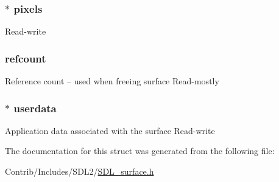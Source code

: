 \subsubsection[{\texorpdfstring{pixels}{pixels}}]{$\ast$ pixels}\hypertarget{struct_s_d_l___surface_aaf78c2553b191735d6902cafb68a92ff}{}\label{struct_s_d_l___surface_aaf78c2553b191735d6902cafb68a92ff}
Read-\/write 
\subsubsection[{\texorpdfstring{refcount}{refcount}}]{ refcount}\hypertarget{struct_s_d_l___surface_a6022c8a609170c7365fb96e83cb2df48}{}\label{struct_s_d_l___surface_a6022c8a609170c7365fb96e83cb2df48}
Reference count -- used when freeing surface Read-\/mostly 
\subsubsection[{\texorpdfstring{userdata}{userdata}}]{$\ast$ userdata}\hypertarget{struct_s_d_l___surface_afd0ffb02780e738d4c0a10ab833b7834}{}\label{struct_s_d_l___surface_afd0ffb02780e738d4c0a10ab833b7834}
Application data associated with the surface Read-\/write 

The documentation for this struct was generated from the following file\+:\begin{DoxyCompactItemize}
\item 
Contrib/\+Includes/\+S\+D\+L2/\hyperlink{_s_d_l__surface_8h}{S\+D\+L\+\_\+surface.\+h}\end{DoxyCompactItemize}
